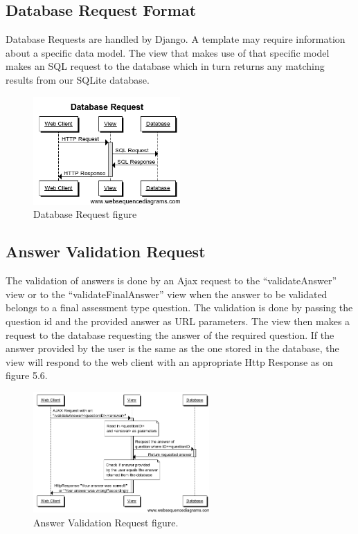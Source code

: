 \documentclass{l3proj}
\begin{document}
\subsection{Database Request Format}
Database Requests are handled by Django. A template may require information about a specific data model. The view that makes use of that specific model makes an SQL request to the database which in turn returns any matching results from our SQLite database.
\begin{figure}[h!]
\caption{Database Request figure}
\centering
\includegraphics[width=0.5\textwidth]{images/databaseMessagePassing.png}
\end{figure}
\subsection{Answer Validation Request}
The validation of answers is done by an Ajax request to the “validateAnswer” view or to the “validateFinalAnswer” view when the answer to be validated belongs to a final assessment type question. The validation is done by passing the question id and the provided answer as URL parameters. The view then makes a request to the database requesting the answer of the required question. If the answer provided by the user is the same as the one stored in the database, the view will respond to the web client with an appropriate Http Response as on figure 5.6.
\begin{figure}[h!]
\caption{Answer Validation Request figure.}
\centering
\includegraphics[width=0.6\textwidth]{images/validateAnswerRequest.png}
\end{figure}
\end{document}
